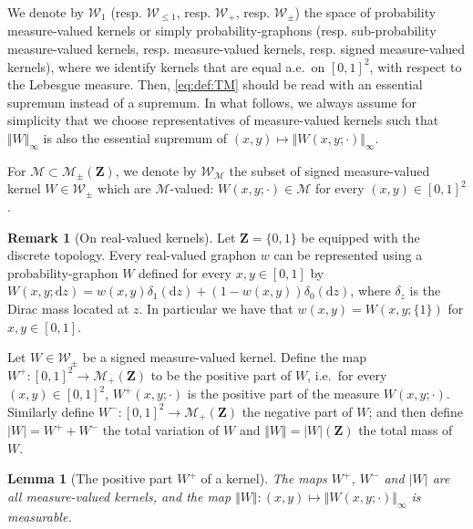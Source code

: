 \documentclass{amsart}
\newcommand{\aE}{a.e.\ }
\newcommand{\ie}{i.e.\ }
\theoremstyle{plain}
\newtheorem{lemme}[Th]{Lemma}
\theoremstyle{definition}
\newtheorem{remark}[Th]{Remark}
\newcommand{\Space}{\mathbf{Z}}
\newcommand{\signed}{\pm}
\newcommand{\cm}{\mathcal{M}}
\newcommand{\cW}{\mathcal{W}}
\newcommand{\Meas}{\mathcal{M}_+(\Space)}
\newcommand{\SignedMeas}{\mathcal{M}_{\pm}(\Space)}
\newcommand{\Graphon}{\mathcal{W}_1}
\newcommand{\SubGraphon}{\mathcal{W}_{\leq 1}}
\newcommand{\Kernel}{\mathcal{W}_{\signed}}
\newcommand{\Kernelp}{\mathcal{W}_{+}}
\newcommand{\TotalMass}[1]{\norm{#1}_\infty}
\newcommand{\TM}[1]{\norm{#1}_\infty}
\newcommand{\drv}{\mathrm{d}}
\newcommand{\norm}[1]{\Vert#1\Vert}
\begin{document}
We denote by  $\Graphon$ (resp. $\SubGraphon$, resp. $\Kernelp$, resp.   $\Kernel$) the space
of  probability  measure-valued  kernels or  simply  probability-graphons
(resp. sub-probability measure-valued kernels,
	resp.  measure-valued  kernels, resp.  signed  measure-valued kernels),
where we identify kernels that are  equal \aE on $[0,1]^2$, with respect
to  the Lebesgue  measure.  Then,  \eqref{eq:def:TM} should  be
read with an  essential supremum instead of a supremum.  In what follows,
we  always  assume for  simplicity  that  we choose  representatives  of
measure-valued kernels such that $\TM{W}$ is also the essential supremum
of $(x,y)\mapsto\TotalMass{W(x, y; \cdot)}$.


For  $\cm\subset\SignedMeas$, we  denote  by $\cW  _\cm$  the subset  of
signed  measure-valued kernel  $W\in  \Kernel$  which are  $\cm$-valued:
$W(x,y; \cdot)\in \cm$ for every $(x,y)\in [0, 1]^2$.

\begin{remark}[On real-valued kernels]\label{rem:real-valued-kernels}
  Let $\Space =\{ 0, 1\}$ be equipped with the discrete topology.  Every
  real-valued  graphon   $w$ can  be     represented  using  a
  probability-graphon  $W$   defined  for  every   $x,y\in[0,1]$  by
  $W(x,y;\drv z)  = w(x,y)  \delta_1(\drv z) +  (1-w(x,y)) \delta_0(\drv
  z)$, where $\delta_z$ is the Dirac mass located at $z$. In
  particular we have that $w(x,y)=W(x,y; \{1\})$ for $x,y \in [0, 1]$. 
\end{remark}


Let $W \in \Kernel$ be a signed measure-valued kernel.
Define the map $W^+ : [0,1]^2 \to \Meas$ to be the positive part of $W$,
	\ie for every $(x,y)\in [0,1]^2$, $W^+(x,y;\cdot)$ is 
	the positive part of the measure $W(x,y;\cdot)$.
Similarly define $W^- : [0,1]^2 \to \Meas$ the negative part of $W$;
and then define $\vert W \vert = W^+ + W^-$ the total variation of $W$
and $\Vert W \Vert = \vert W \vert (\Space)$ the total mass of $W$.

\begin{lemme}[The positive part $W^+$ of a kernel]\label{lem:mesurability_W_+}
The maps $W^+$, $W^-$ and $\vert W \vert$ are all measure-valued kernels,
and the map $\Vert W \Vert : (x,y) \mapsto \TM{W(x,y;\cdot)}$ is measurable.
\end{lemme}
\end{document}
